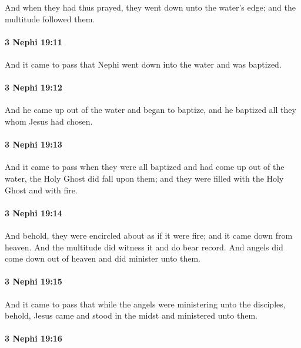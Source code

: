 			And when they had thus prayed,
			they went down unto the water's edge;
			and the multitude followed them.

		\paragraph{3 Nephi 19:11} %
			\label{3NEPHI-19-11}

			And it came to pass that Nephi went down into the water and was baptized.

		\paragraph{3 Nephi 19:12} %
			\label{3NEPHI-19-12}

			And he came up out of the water and began to baptize,
			and he baptized all they whom Jesus had chosen.

		\paragraph{3 Nephi 19:13} %
			\label{3NEPHI-19-13}

			And it came to pass when they were all baptized
			and had come up out of the water,
			the Holy Ghost did fall upon them;
			and they were filled with the Holy Ghost and with fire.

		\paragraph{3 Nephi 19:14} %
			\label{3NEPHI-19-14}

			And behold, they were encircled about as if it were fire;
			and it came down from heaven.
			And the multitude did witness it and do bear record.
			And angels did come down out of heaven and did minister unto them.

		\paragraph{3 Nephi 19:15} %
			\label{3NEPHI-19-15}

			And it came to pass that while the angels were ministering unto the disciples,
			behold, Jesus came and stood in the midst and ministered unto them.

		\paragraph{3 Nephi 19:16} %
			\label{3NEPHI-19-16}

